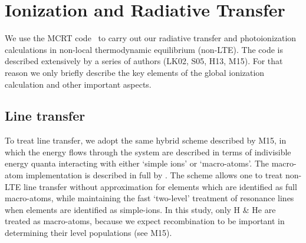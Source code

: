 \documentclass[preprint, a4paper, 11pt]{aastex}
\begin{document}











\section{Ionization and Radiative Transfer}

We use the MCRT code \py\ to carry out our radiative transfer and photoionization
calculations in non-local thermodynamic equilibrium (non-LTE). 
The code is described extensively by a series of authors (LK02, S05, H13, M15).
For that reason we only briefly describe the key elements of the global 
ionization calculation and other important aspects.

\subsection{Line transfer}

To treat line transfer, we adopt the same hybrid scheme 
described by M15, 
in which the energy flows
through the system are described in terms of indivisible
energy quanta interacting with either `simple ions'
or `macro-atoms'. The macro-atom implementation 
is described in full by \cite{lucy2002, lucy2003}.
The scheme allows one to treat non-LTE line transfer without
approximation for elements which are identified as 
full macro-atoms, while maintaining the fast `two-level' 
treatment of resonance lines when elements are identified 
as simple-ions. In this study,
only H \& He are treated as macro-atoms, because 
we expect recombination to be important
in determining their level populations (see M15).
\end{document}
